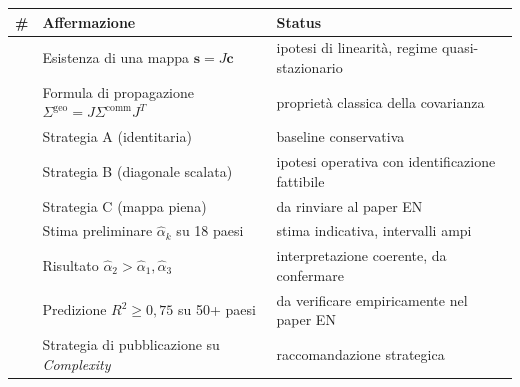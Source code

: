 {\def\LTcaptype{none} %
{\small\begin{longtable}[]{@{}
  >{\raggedright\arraybackslash}p{}
  >{\raggedright\arraybackslash}p{}
  >{\raggedright\arraybackslash}p{}@{}}
\toprule\noalign{}
\begin{minipage}[b]{\linewidth}\raggedright
\#
\end{minipage} & \begin{minipage}[b]{\linewidth}\raggedright
Affermazione
\end{minipage} & \begin{minipage}[b]{\linewidth}\raggedright
Status
\end{minipage} \\
\midrule\noalign{}
\endhead
\bottomrule\noalign{}
\endlastfoot
1 & Esistenza di una mappa \(\mathbf{s} = J \mathbf{c}\) & \Hypoth{}
ipotesi di linearità, regime quasi-stazionario \\
2 & Formula di propagazione
\(\Sigma^{\text{geo}} = J \Sigma^{\text{comm}} J^T\) & \Proved{}
proprietà classica della covarianza \\
3 & Strategia A (identitaria) & \Hypoth{} baseline conservativa \\
4 & Strategia B (diagonale scalata) & \Hypoth{} ipotesi operativa con
identificazione fattibile \\
5 & Strategia C (mappa piena) & \Conj{} da rinviare al paper EN \\
6 & Stima preliminare \(\hat\alpha_k\) su 18 paesi & \Conj{} stima
indicativa, intervalli ampi \\
7 & Risultato \(\hat\alpha_2 > \hat\alpha_1, \hat\alpha_3\) & \Hypoth{}
interpretazione coerente, da confermare \\
8 & Predizione \(R^2 \geq 0{,}75\) su 50+ paesi & \ToVerify{} da
verificare empiricamente nel paper EN \\
9 & Strategia di pubblicazione su \emph{Complexity} & \Hypoth{}
raccomandazione strategica \\
\end{longtable}}
}


